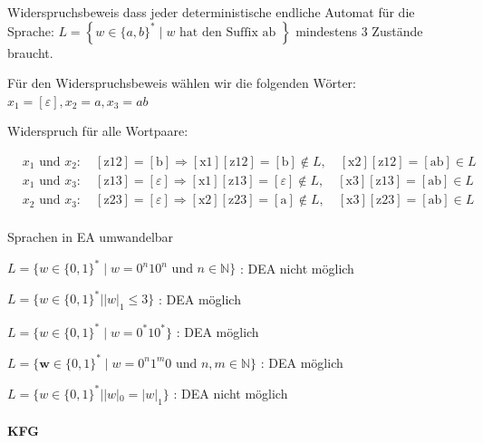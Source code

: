 \begin{example2}{Widerspruchsbeweis}
   dass jeder deterministische endliche Automat für die Sprache:
$
L=\left\{w \in\{a, b\}^* \mid w \text { hat den Suffix ab }\right\}
$
mindestens 3 Zustände braucht.

Für den Widerspruchsbeweis wählen wir die folgenden Wörter: $x_1=[\varepsilon], x_2=a, x_3=ab$

Widerspruch für alle Wortpaare:

$
\begin{aligned}
& x_1 \text { und } x_2: \quad[\mathrm{z} 12]=[\mathrm{b}] \Rightarrow[\mathrm{x} 1][\mathrm{z} 12]=[\mathrm{b}] \notin L, \quad[\mathrm{x} 2][\mathrm{z} 12]=[\mathrm{ab}] \in L \\
& x_1 \text { und } x_3: \quad[\mathrm{z} 13]=[\varepsilon] \Rightarrow[\mathrm{x} 1][\mathrm{z} 13]=[\varepsilon] \notin L, \quad[\mathrm{x} 3][\mathrm{z} 13]=[\mathrm{ab}] \in L \\
& x_2 \text { und } x_3: \quad[\mathrm{z} 23]=[\varepsilon] \Rightarrow[\mathrm{x} 2][\mathrm{z} 23]=[\mathrm{a}] \notin L, \quad[\mathrm{x} 3][\mathrm{z} 23]=[\mathrm{ab}] \in L \\
&
\end{aligned}
$
\end{example2}

\begin{example2}{Sprachen in EA umwandelbar}

    $
L=\{w \in\{0,1\}^* \mid w=0^n 10^n \text { und } n \in \mathbb{N}\}
$
: DEA nicht möglich

$
L=\{w \in\{0,1\}^*|| w|_1 \leq 3\}
$
: DEA möglich

$
L=\{w \in\{0,1\}^* \mid w=0^* 10^*\}
$
: DEA möglich

$
L=\{\boldsymbol{w} \in\{0,1\}^* \mid w=0^n 1^m 0 \text { und } n, m \in \mathbb{N}\}
$
: DEA möglich

$
L=\{w \in\{0,1\}^*|| w|_0=|w|_1\}
$
: DEA nicht möglich
\end{example2}

\paragraph{KFG}

